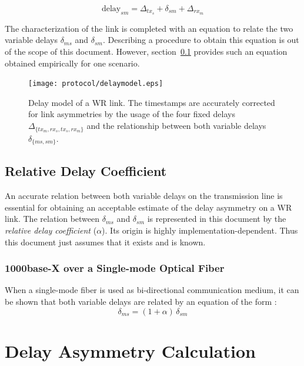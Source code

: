 \documentclass[a4paper, 12pt]{article}
\newcommand{\eqdelay}[1]{{\text{delay}}_{#1}}
\begin{document}
\begin{equation}
  \label{eq:delaysm}
  \eqdelay{sm} = \Delta_{tx_s} + \delta_{sm} + \Delta_{rx_m}
\end{equation}

The characterization of the link is completed with an equation to
relate the two variable delays $\delta_{ms}$ and $\delta_{sm}$.
Describing a procedure to obtain this equation is out of the scope of this document. However, 
section~\ref{sec:physcorr} provides such an equation obtained empirically for one scenario.

\begin{figure}[ht!]
  \centering
    \texttt{[image: protocol/delaymodel.eps]}
  \caption{Delay model of a WR link. The timestamps are accurately corrected
    for link asymmetries by the usage of the four fixed delays
    $\Delta_{\{tx_m, rx_s, tx_s, rx_m\}}$ and the relationship
    between both variable delays $\delta_{\{ms, sm\}}$. }
  \label{fig:delaymodel}
\end{figure}

\subsection{Relative Delay Coefficient}
\label{sec:physcorr}

An accurate relation between both variable delays on the transmission line
is essential for obtaining an acceptable estimate of the delay asymmetry on a
WR link. The relation between $\delta_{ms}$ and $\delta_{sm}$ is represented in 
this document by the \textit{relative delay coefficient} ($\alpha$).
Its origin is highly implementation-dependent. Thus this document just assumes that it exists 
and is known. 

\subsubsection{1000base-X over a Single-mode Optical Fiber}
\label{sec:singlefiber}
When a single-mode fiber is used as bi-directional communication medium,
it can be shown that both variable delays are related by an equation of
the form \cite{Peek2010}:
\begin{equation}
\delta_{ms} = (1 + \alpha) \, \delta_{sm}
\label{eq:singlefiber}
\end{equation}

\section{Delay Asymmetry Calculation}
\label{sec:delayAsymCal}
\end{document}

